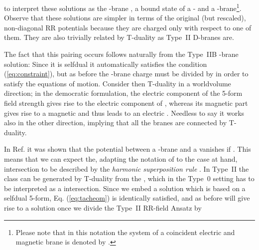 \documentclass[12pt,a4paper]{article}
\begin{document}
to interpret these solutions as the \coordHE{}-brane \cite{kn:costa},
a bound state of a \coordHE{}- and a \coordHE{}-brane\footnote{Please note
  that in this notation the system of a coincident electric and
  magnetic \coordHE{} brane \cite{kn:KlTs3} is denoted by \coordHE{}.}.
Observe that these solutions are simpler in terms of the original (but
rescaled), non-diagonal \coordHE{} RR potentials
because they are charged only with respect to one of them.  They are
also trivially related by T-duality as Type~II D\coordHE{}-branes are.
\par
The fact that this pairing occurs follows naturally from the Type~IIB
\coordHE{}-brane solution: Since it is selfdual it automatically satisfies
the condition (\ref{eq:constraint}), but as before the \coordHE{}-brane
charge must be divided by \coordHE{} in order to satisfy the equations
of motion.  Consider then T-duality in a worldvolume direction; in the
democratic formulation, the electric component of the 5-form field
strength gives rise to the electric component of \coordHE{},
whereas its magnetic part gives rise to a magnetic \coordHE{} and
thus leads to an electric \coordHE{}. Needless to say it works also
in the other direction, implying that all the \coordHE{} branes are
connected by T-duality.
\par
In Ref. \cite{kn:costa} it was shown that the potential between a
\coordHE{}-brane and a \coordHE{} vanishes if \coordHE{}.  This
means that we can expect the, adapting the notation of
\cite{kn:BdREJvdS} to the case at hand, \coordHE{} intersection to be described by
the {\it harmonic superposition rule} \cite{kn:Ts-M}.  In Type~II the
\coordHE{} class can be generated by T-duality from the \coordHE{}, which in the Type~0 setting has to be interpreted as
a \coordHE{} intersection.  Since we
embed a solution which is based on a selfdual 5-form, Eq.
(\ref{eq:tacheom}) is identically satisfied, and as before will give
rise to a solution once we divide the Type~II RR-field Ansatz by
\end{document}
